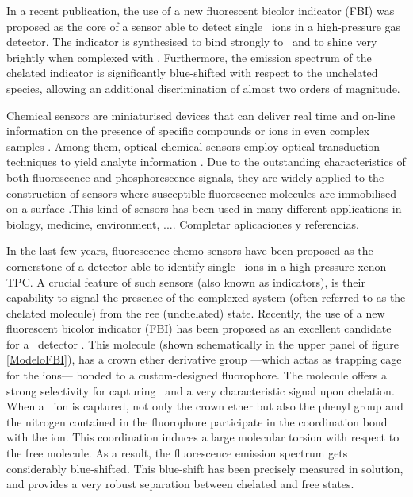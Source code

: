 \documentclass[aps,prl,reprint,longbibliography,superscriptaddress, english]{revtex4-1}
\newcommand{\completar}[1]{{\color{red} #1}}
\begin{document}
In a recent publication, the use of a new fluorescent bicolor indicator (FBI) 
was proposed as the core of a sensor able to detect single \Bapp\ ions in a
high-pressure gas detector\cite{rivilla_fluorescent_2020}. The indicator is synthesised to bind strongly to \Bapp\ 
and to shine very brightly when complexed with \Bapp. Furthermore, the emission spectrum of the chelated indicator is significantly blue-shifted  with respect to the unchelated species, allowing an additional discrimination of almost two  orders of magnitude. 

Chemical sensors are miniaturised devices that can deliver real time and on-line information on the presence of specific compounds or ions in even complex samples \cite{cammann1996cambridge}. 
Among them, optical chemical sensors employ optical transduction techniques to yield analyte information \cite{mcdonagh_optical_2008}. Due to the outstanding characteristics of both fluorescence and phosphorescence signals, they are widely applied to the construction of  sensors where susceptible fluorescence molecules are immobilised on a surface \cite{wolfbeis_materials_2005}.This kind of sensors has been used in many different applications in biology, medicine, environment,  \completar{.... Completar aplicaciones y referencias}. 
 
In the last few years, fluorescence chemo-sensors have been proposed as the cornerstone of a detector able to identify single \Bapp\ ions in a high pressure xenon TPC\cite{Nygren_2015, Jones:2016qiq, McDonald:2017izm, thapa_barium_2019, thapa_demonstration_2021}. A crucial feature of such sensors (also known as indicators), is their capability to signal the presence of the complexed system (often referred to as the chelated molecule) from the ree (unchelated) state. Recently, the use of a new fluorescent bicolor indicator (FBI) 
has been proposed as an excellent candidate for a \Bapp\ detector \cite{rivilla_fluorescent_2020}. This molecule (shown schematically in the upper panel of figure \ref{ModeloFBI}), has a crown ether derivative group ---which actas as trapping cage for the ions--- bonded to a custom-designed fluorophore. The molecule offers a strong selectivity for capturing \Bapp\ and a very characteristic signal upon chelation. When a \Bapp\ ion is captured, not only the crown ether but also the phenyl group and the nitrogen contained in the fluorophore participate in the coordination bond with the  ion. This coordination induces a large molecular torsion with respect to the free  molecule. As a result, the fluorescence emission spectrum gets considerably blue-shifted. This blue-shift has been precisely measured in solution, and provides a very robust separation between chelated and free states.
\end{document}
